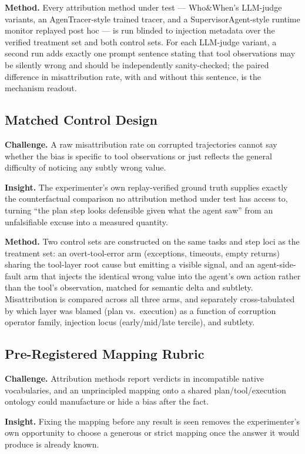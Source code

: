 \documentclass[11pt]{article}
\begin{document}
\textbf{Method.} Every attribution method under test --- Who\&When's \citep{WhoWhenGazlTYxZss} LLM-judge variants, an AgenTracer-style \citep{AgenTracerl05DseqvuD} trained tracer, and a SupervisorAgent-style \citep{SupervisorAgentpzFhtpkabh} runtime monitor replayed post hoc --- is run blinded to injection metadata over the verified treatment set and both control sets. For each LLM-judge variant, a second run adds exactly one prompt sentence stating that tool observations may be silently wrong and should be independently sanity-checked; the paired difference in misattribution rate, with and without this sentence, is the mechanism readout.

\subsection{Matched Control Design}
\textbf{Challenge.} A raw misattribution rate on corrupted trajectories cannot say whether the bias is specific to tool observations or just reflects the general difficulty of noticing any subtly wrong value.

\textbf{Insight.} The experimenter's own replay-verified ground truth supplies exactly the counterfactual comparison no attribution method under test has access to, turning ``the plan step looks defensible given what the agent saw'' from an unfalsifiable excuse into a measured quantity.

\textbf{Method.} Two control sets are constructed on the same tasks and step loci as the treatment set: an overt-tool-error arm (exceptions, timeouts, empty returns) sharing the tool-layer root cause but emitting a visible signal, and an agent-side-fault arm that injects the identical wrong value into the agent's own action rather than the tool's observation, matched for semantic delta and subtlety. Misattribution is compared across all three arms, and separately cross-tabulated by which layer was blamed (plan vs.\ execution) as a function of corruption operator family, injection locus (early/mid/late tercile), and subtlety.

\subsection{Pre-Registered Mapping Rubric}
\textbf{Challenge.} Attribution methods report verdicts in incompatible native vocabularies, and an unprincipled mapping onto a shared plan/tool/execution ontology could manufacture or hide a bias after the fact.

\textbf{Insight.} Fixing the mapping before any result is seen removes the experimenter's own opportunity to choose a generous or strict mapping once the answer it would produce is already known.
\end{document}
